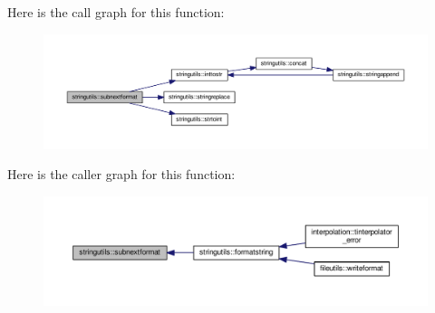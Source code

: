 Here is the call graph for this function\+:
\nopagebreak
\begin{figure}[H]
\begin{center}
\leavevmode
\includegraphics[width=350pt]{namespacestringutils_a052ed985538275100bc601b4bfffde94_cgraph}
\end{center}
\end{figure}
Here is the caller graph for this function\+:
\nopagebreak
\begin{figure}[H]
\begin{center}
\leavevmode
\includegraphics[width=350pt]{namespacestringutils_a052ed985538275100bc601b4bfffde94_icgraph}
\end{center}
\end{figure}
